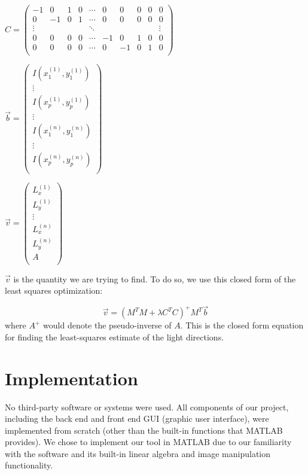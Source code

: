 \documentclass[10pt,twocolumn,letterpaper]{article}
\begin{document}
	
$C = 
	\begin{pmatrix}
	-1 & 0 & 1 & 0 & \cdots & 0 & 0 & 0 & 0 & 0\\
	0 & -1 & 0 & 1 & \cdots & 0 & 0 & 0 & 0 & 0\\
	\vdots & & & & \ddots & & & & & \vdots\\
	0 & 0 & 0 & 0 & \cdots & -1 & 0 & 1 & 0 & 0\\
	0 & 0 & 0 & 0 & \cdots & 0 & -1 & 0 & 1 & 0\\
	\end{pmatrix}$
	
$\vec{b} =
	\begin{pmatrix}
	I(x^{(1)}_1,y^{(1)}_1)\\
	\vdots\\
	I(x^{(1)}_p,y^{(1)}_p)\\
	\vdots\\
	I(x^{(n)}_1,y^{(n)}_1)\\
	\vdots\\
	I(x^{(n)}_p,y^{(n)}_p)\\
	\end{pmatrix}$


$\vec{v} = 
	\begin{pmatrix}
	L^{(1)}_x\\
	L^{(1)}_y\\
	\vdots\\
	L^{(n)}_x\\
	L^{(n)}_y\\
	A\\
	\end{pmatrix}$
	
$\vec{v}$ is the quantity we are trying to find. To do so, we use this closed form of the least squares optimization:

\[\vec{v} = (M^TM + \lambda C^TC)^+M^T\vec{b}\] where $A^+$ would denote the pseudo-inverse of $A$. This is the closed form equation for finding the least-squares estimate of the light directions.



\section{Implementation}

No third-party software or systems were used. All components of our project, including the back end and front end GUI (graphic user interface), were implemented from scratch (other than the built-in functions that MATLAB provides). We chose to implement our tool in MATLAB due to our familiarity with the software and its built-in linear algebra and image manipulation functionality.
\end{document}
